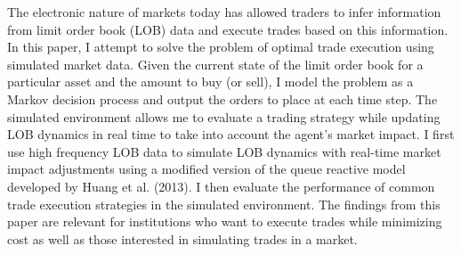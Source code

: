 The electronic nature of markets today has allowed traders to infer information from limit order book (LOB) data and execute trades based on this information. In this paper, I attempt to solve the problem of optimal trade execution using simulated market data. Given the current state of the limit order book for a particular asset and the amount to buy (or sell), I model the problem as a Markov decision process and output the orders to place at each time step. The simulated environment allows me to evaluate a trading strategy while updating LOB dynamics in real time to take into account the agent's market impact. I first use high frequency LOB data to simulate LOB dynamics with real-time market impact adjustments using a modified version of the queue reactive model developed by Huang et al. (2013). I then evaluate the performance of common trade execution strategies in the simulated environment. The findings from this paper are relevant for institutions who want to execute trades while minimizing cost as well as those interested in simulating trades in a market.